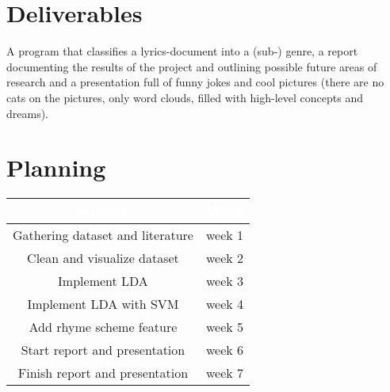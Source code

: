 \documentclass[12pt,a4paper]{amsart}
\begin{document}
\section{Deliverables}
A program that classifies a lyrics-document into a (sub-) genre, a report documenting the results of the project and outlining possible future areas of research and a presentation full of funny jokes and cool pictures (there are no cats on the pictures, only word clouds, filled with high-level concepts and dreams).
\section{Planning}

\begin{tabular}{ |c | c |}
\rowcolor{dark-gray}
\hline
\textcolor{white}{\textbf{Subject}} & \textcolor{white}{\textbf{Week}}\\
	\hline
	Gathering dataset and literature & week 1  \\
	\hline
	Clean and visualize dataset & week 2 \\
	\hline
	Implement LDA & week 3 \\
	\hline
	Implement LDA with SVM & week 4 \\
	\hline
	Add rhyme scheme feature & week 5 \\
	\hline
	Start report and presentation & week 6 \\
	\hline
	Finish report and presentation & week 7\\
	\hline
\end{tabular}\\



\end{document}
